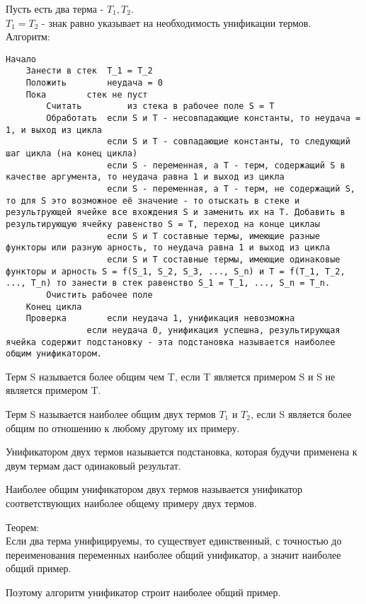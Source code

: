 Пусть есть два терма - $T_1, T_2$.\\
$T_1 = T_2$ - знак равно указывает на необходимость унификации термов.\\
Алгоритм:
\begin{lstlisting}
Начало
	Занести в стек  T_1 = T_2
	Положить 		неудача = 0
	Пока 		стек не пуст
		Считать 		из стека в рабочее поле S = T
		Обработать	если S и T - несовпадающие константы, то неудача = 1, и выход из цикла
					если S и T - совпадающие константы, то следующий шаг цикла (на конец цикла)
					если S - переменная, а T - терм, содержащий S в качестве аргумента, то неудача равна 1 и выход из цикла
					если S - переменная, а T - терм, не содержащий S, то для S это возможное её значение - то отыскать в стеке и результрующей ячейке все вхождения S и заменить их на T. Добавить в результирующую ячейку равенство S = T, переход на конце циклаы
					если S и T составные термы, имеющие разные функторы или разную арность, то неудача равна 1 и выход из цикла
					если S и T составные термы, имеющие одинаковые функторы и арность S = f(S_1, S_2, S_3, ..., S_n) и T = f(T_1, T_2, ..., T_n) то занести в стек равенство S_1 = T_1, ..., S_n = T_n.
		Очистить рабочее поле
	Конец цикла
	Проверка		если неудача 1, унификация невозможна
				если неудача 0, унификация успешна, результирующая ячейка содержит подстановку - эта подстановка называется наиболее общим унификатором.
\end{lstlisting}
	
Терм S называется более общим чем T, если T является примером S и S не является примером T.

Терм S называется наиболее общим двух термов $T_1$ и $T_2$, если S является более общим по отношению к любому другому их примеру. 

Унификатором двух термов называется подстановка, которая будучи применена к двум термам даст одинаковый результат.

Наиболее общим унификатором двух термов называется унификатор соответствующих наиболее общему примеру двух термов.

Теорем:\\
Если два терма унифицируемы, то существует единственный, с точностью до переименования переменных наиболее общий унификатор, а значит наиболее общий пример. 

Поэтому алгоритм унификатор строит наиболее общий пример.

